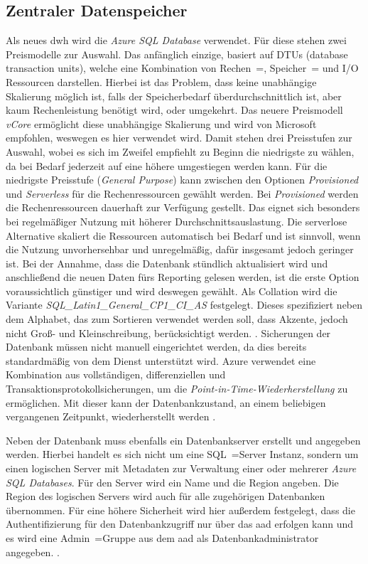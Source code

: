 \subsection{Zentraler Datenspeicher} \label{subsec:infra:konfig:datenspeicher}
Als neues \ac{dwh} wird die \textit{Azure SQL Database} verwendet. Für diese stehen zwei Preismodelle zur Auswahl. Das anfänglich einzige, basiert auf DTUs (database transaction units), welche eine Kombination von Rechen~=, Speicher~= und I/O Ressourcen darstellen. Hierbei ist das Problem, dass keine unabhängige Skalierung möglich ist, falls der Speicherbedarf überdurchschnittlich ist, aber kaum Rechenleistung benötigt wird, oder umgekehrt. Das neuere Preismodell \textit{vCore} ermöglicht diese unabhängige Skalierung und wird von Microsoft empfohlen, weswegen es hier verwendet wird. Damit stehen drei Preisstufen zur Auswahl, wobei es sich im Zweifel empfiehlt zu Beginn die niedrigste zu wählen, da bei Bedarf jederzeit auf eine höhere umgestiegen werden kann. Für die niedrigste Preisstufe (\textit{General Purpose}) kann zwischen den Optionen \textit{Provisioned} und \textit{Serverless} für die Rechenressourcen gewählt werden. Bei \textit{Provisioned} werden die Rechenressourcen dauerhaft zur Verfügung gestellt. Das eignet sich besonders bei regelmäßiger Nutzung mit höherer Durchschnittsauslastung. Die serverlose Alternative skaliert die Ressourcen automatisch bei Bedarf und ist sinnvoll, wenn die Nutzung unvorhersehbar und unregelmäßig, dafür insgesamt jedoch geringer ist. Bei der Annahme, dass die Datenbank stündlich aktualisiert wird und anschließend die neuen Daten fürs Reporting gelesen werden, ist die erste Option voraussichtlich günstiger und wird deswegen gewählt. Als Collation wird die Variante \textit{SQL{\_}Latin1{\_}General{\_}CP1{\_}CI{\_}AS} festgelegt. Dieses spezifiziert neben dem Alphabet, das zum Sortieren verwendet werden soll, dass Akzente, jedoch nicht Groß- und Kleinschreibung, berücksichtigt werden. \cite[vgl.][]{mauri_practical_2021}. Sicherungen der Datenbank müssen nicht manuell eingerichtet werden, da dies bereits standardmäßig von dem Dienst unterstützt wird. Azure verwendet eine Kombination aus vollständigen, differenziellen und Transaktionsprotokollsicherungen, um die \textit{Point-in-Time-Wiederherstellung} zu ermöglichen. Mit dieser kann der Datenbankzustand, an einem beliebigen vergangenen Zeitpunkt, wiederherstellt werden \cite{reagan_web_2018}.

Neben der Datenbank muss ebenfalls ein Datenbankserver erstellt und angegeben werden. Hierbei handelt es sich nicht um eine SQL~=Server Instanz, sondern um einen logischen Server mit Metadaten zur Verwaltung einer oder mehrerer \textit{Azure SQL Databases}. Für den Server wird ein Name und die Region angeben. Die Region des logischen Servers wird auch für alle zugehörigen Datenbanken übernommen. Für eine höhere Sicherheit wird hier außerdem festgelegt, dass die Authentifizierung für den Datenbankzugriff nur über das \ac{aad} erfolgen kann und es wird eine Admin~=Gruppe aus dem \ac{aad} als Datenbankadministrator angegeben. \cite[vgl.][]{ward_azure_2021}.

